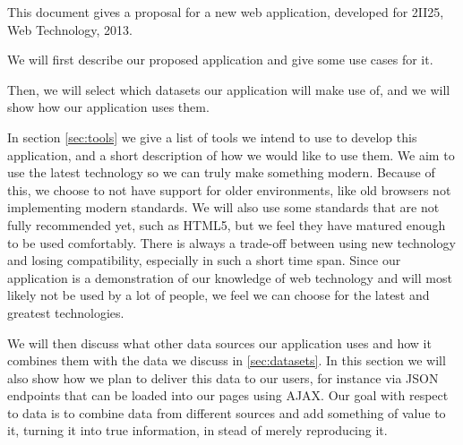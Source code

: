 This document gives a proposal for a new web application, developed for 2II25, Web Technology, 2013.

We will first describe our proposed application and give some use cases for it.

Then, we will select which datasets our application will make use of, and we will show how our application uses them.

In section \ref{sec:tools} we give a list of tools we intend to use to develop this application, and a short description of how we would like to use them.
We aim to use the latest technology so we can truly make something modern.
Because of this, we choose to not have support for older environments, like old browsers not implementing modern standards.
We will also use some standards that are not fully recommended yet, such as HTML5, but we feel they have matured enough to be used comfortably.
There is always a trade-off between using new technology and losing compatibility, especially in such a short time span.
Since our application is a demonstration of our knowledge of web technology and will most likely not be used by a lot of people, we feel we can choose for the latest and greatest technologies.

We will then discuss what other data sources our application uses and how it combines them with the data we discuss in \ref{sec:datasets}.
In this section we will also show how we plan to deliver this data to our users, for instance via JSON endpoints that can be loaded into our pages using AJAX.
Our goal with respect to data is to combine data from different sources and add something of value to it, turning it into true information, in stead of merely reproducing it.
